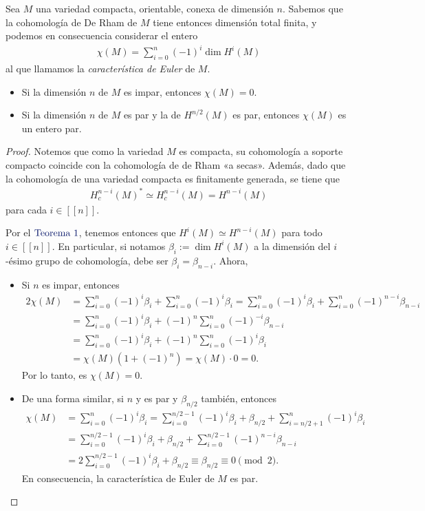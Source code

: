 \documentclass[11pt]{article}
\newcommand{\nat}[1]{[\![#1]\!]}
\newcommand{\paint}[1]{\color{color}{#1}}
\newcommand{\tpaing}[1]{\paint{\text{#1}}}
\newenvironment{exercise}[2][Ejercicio]{\begin{trivlist}
\item[\hskip \labelsep \paint{{\bfseries #1}}\hskip \labelsep {\bfseries #2.}]}{\end{trivlist}}
\begin{document}
\begin{exercise}{4} Sea $M$ una variedad compacta, orientable, conexa de dimensión $n$. Sabemos que la cohomología de De Rham de $M$ tiene entonces dimensión total finita, y podemos en consecuencia considerar el entero
\begin{align*}
\chi(M) = \sum_{i=0}^{n}(-1)^i \dim H^i(M)
\end{align*}
al que llamamos la \textit{característica de Euler} de $M$.
\begin{itemize}
\item[(a)] Si la dimensión $n$ de $M$ es impar, entonces $\chi(M) = 0$.
\item[(b)] Si la dimensión $n$ de $M$ es par y la de $H^{n/2}(M)$ es par, entonces $\chi(M)$ es un entero par.
\end{itemize}
\end{exercise}
\begin{proof} Notemos que como la variedad $M$ es compacta, su cohomología a soporte compacto coincide con la cohomología de de Rham «a secas». Además, dado que la cohomología de una variedad compacta es finitamente generada, se tiene que
\begin{align*}
H^{n-i}_c(M)^* \simeq H^{n-i}_c(M) = H^{n-i}(M)
\end{align*}
para cada $i \in \nat{n}$.

Por el $\tpaing{Teorema $1$}$, tenemos entonces que $H^i(M) \simeq H^{n-i}(M)$ para todo $i \in \nat{n}$. En particular, si notamos $\beta_i := \dim H^i(M)$ a la dimensión del $i$-ésimo grupo de cohomología, debe ser $\beta_i = \beta_{n-i}$.
Ahora,
\begin{itemize}
\item[(a)] Si $n$ es impar, entonces
\begin{align*}
2\chi(M) &= \sum_{i=0}^{n}(-1)^i\beta_i + \sum_{i=0}^{n}(-1)^i\beta_i =
\sum_{i=0}^{n}(-1)^i\beta_i + \sum_{i=0}^{n}(-1)^{n-i}\beta_{n-i}\\
&= \sum_{i=0}^{n}(-1)^i\beta_i + (-1)^n\sum_{i=0}^{n}(-1)^{-i}\beta_{n-i}\\
&= \sum_{i=0}^{n}(-1)^i\beta_i + (-1)^n\sum_{i=0}^{n}(-1)^{i}\beta_{i}\\
&= \chi(M)(1 + (-1)^n) = \chi(M) \cdot  0 = 0.
\end{align*}
Por lo tanto, es $\chi(M) = 0$.
\item[(b)] De una forma similar, si $n$ y es par y $\beta_{n/2}$ también, entonces
\begin{align*}
\chi(M) &= \sum_{i=0}^{n}(-1)^i\beta_i = \sum_{i=0}^{n/2-1}(-1)^i\beta_i + \beta_{n/2} + \sum_{i=n/2+1}^{n}(-1)^i\beta_i\\
&= \sum_{i=0}^{n/2-1}(-1)^i\beta_i + \beta_{n/2} + \sum_{i=0}^{n/2-1}(-1)^{n-i}\beta_{n-i}\\
&= 2\sum_{i=0}^{n/2-1}(-1)^i\beta_i + \beta_{n/2} \equiv \beta_{n/2} \equiv 0 \pmod{2}.
\end{align*}
En consecuencia, la característica de Euler de $M$ es par.
\end{itemize}
\end{proof}
\end{document}
